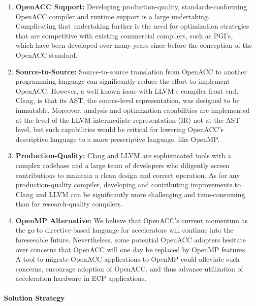 \begin{enumerate}

\item \textbf{OpenACC Support:} Developing production-quality,
standards-conforming OpenACC compiler and runtime support is a large
undertaking.  Complicating that undertaking further is the need for
optimization strategies that are competitive with existing commercial
compilers, such as PGI's, which have been developed over many years since
before the conception of the OpenACC standard.

\item \textbf{Source-to-Source:} Source-to-source translation from OpenACC
to another programming language can significantly reduce the effort to
implement OpenACC.  However, a well known issue with LLVM's compiler front
end, Clang, is that its AST, the source-level representation, was designed
to be immutable.  Moreover, analysis and optimization capabilities are
implemented at the level of the LLVM intermediate representation (IR) not at
the AST level, but such capabilities would be critical for lowering
OpenACC's descriptive language to a more prescriptive language, like OpenMP.

\item \textbf{Production-Quality:} Clang and LLVM are sophisticated tools
with a complex codebase and a large team of developers who diligently screen
contributions to maintain a clean design and correct operation.  As for any
production-quality compiler, developing and contributing improvements to
Clang and LLVM can be significantly more challenging and time-consuming than
for research-quality compilers.

\item \textbf{OpenMP Alternative:} We believe that OpenACC's current
momentum as the go-to directive-based language for accelerators will
continue into the foreseeable future.  Nevertheless, some potential OpenACC
adopters hesitate over concerns that OpenACC will one day be replaced by
OpenMP features.  A tool to migrate OpenACC applications to OpenMP could
alleviate such concerns, encourage adoption of OpenACC, and thus advance
utilization of acceleration hardware in ECP applications.

\end{enumerate}

\paragraph{Solution Strategy}


